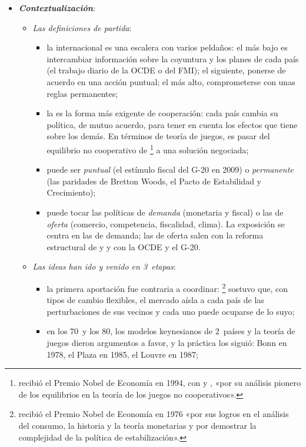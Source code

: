 \documentclass[11pt]{article}
\begin{document}
\begin{itemize}
\item \textbf{\emph{Contextualización}}:
  \begin{itemize}
  \item \emph{Las definiciones de partida}:
    \begin{itemize}
    \item la  internacional es una escalera con varios peldaños: el más bajo es intercambiar información sobre la coyuntura y los planes de cada país (el trabajo diario de la OCDE o del FMI); el siguiente, ponerse de acuerdo en una acción puntual; el más alto, comprometerse con unas reglas permanentes;
    \item la  es la forma más exigente de cooperación: cada país cambia su política, de mutuo acuerdo, para tener en cuenta los efectos que tiene sobre los demás. En términos de teoría de juegos, es pasar del equilibrio no cooperativo de \footnote{ recibió el Premio Nobel de Economía en 1994, con  y , «por su análisis pionero de los equilibrios en la teoría de los juegos no cooperativos»\nocite{Nobel1994Nash}.} a una solución negociada\nocite{Frankel2016Coordination};
    \item puede ser \emph{puntual} (el estímulo fiscal del G-20 en 2009) o \emph{permanente} (las paridades de Bretton Woods, el Pacto de Estabilidad y Crecimiento);
    \item puede tocar las políticas de \emph{demanda} (monetaria y fiscal) o las de \emph{oferta} (comercio, competencia, fiscalidad, clima). La exposición se centra en las de demanda; las de oferta salen con la reforma estructural de  y  y con la OCDE y el G-20.
    \end{itemize}
  \item \emph{Las ideas han ido y venido en 3~etapas}\nocite{Bergin2008Palgrave}:
    \begin{itemize}
    \item la primera aportación fue contraria a coordinar: \textcite{Friedman1953Case}\footnote{ recibió el Premio Nobel de Economía en 1976 «por sus logros en el análisis del consumo, la historia y la teoría monetarias y por demostrar la complejidad de la política de estabilización»\nocite{Nobel1976Friedman}.} sostuvo que, con tipos de cambio flexibles, el mercado aísla a cada país de las perturbaciones de sus vecinos y cada uno puede ocuparse de lo suyo;
    \item en los 70~y los 80, los modelos keynesianos de 2~países y la teoría de juegos dieron argumentos a favor\nocite{Hamada1976Strategic,OudizSachs1984,CanzoneriGray1985}, y la práctica los siguió: Bonn en 1978, el Plaza en 1985, el Louvre en 1987\nocite{Frankel2016Coordination};

\end{itemize}
\end{itemize}
\end{itemize}
\end{document}

